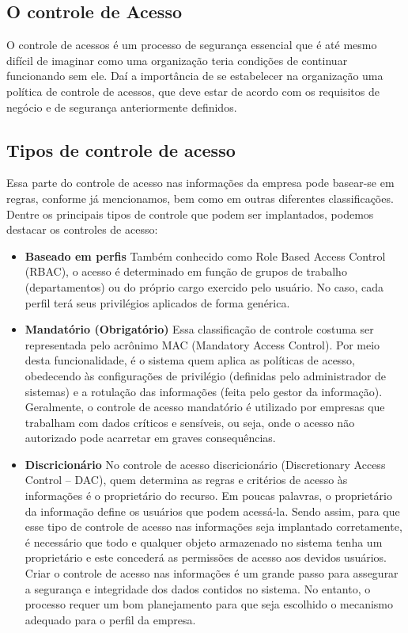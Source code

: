 \documentclass[12pt, a4paper]{report}
\begin{document}
\subsection{O controle de Acesso}
O controle de acessos é um processo de segurança essencial que é até mesmo difícil de imaginar como uma organização teria condições de continuar funcionando sem ele. Daí a importância de se estabelecer na organização uma política de controle de acessos, que deve estar de acordo com os requisitos de negócio e de segurança anteriormente definidos.
\subsection{Tipos de controle de acesso}
Essa parte do controle de acesso nas informações da empresa pode basear-se em regras, conforme já mencionamos, bem como em outras diferentes classificações. Dentre os principais tipos de controle que podem ser implantados, podemos destacar os controles de acesso:
\begin{itemize}
\item \textbf{Baseado em perfis}
Também conhecido como Role Based Access Control (RBAC), o acesso é determinado em função de grupos de trabalho (departamentos) ou do próprio cargo exercido pelo usuário. No caso, cada perfil terá seus privilégios aplicados de forma genérica.
\item \textbf{Mandatório (Obrigatório)}
Essa classificação de controle costuma ser representada pelo acrônimo MAC (Mandatory Access Control). Por meio desta funcionalidade, é o sistema quem aplica as políticas de acesso, obedecendo às configurações de privilégio (definidas pelo administrador de sistemas) e a rotulação das informações (feita pelo gestor da informação).
Geralmente, o controle de acesso mandatório é utilizado por empresas que trabalham com dados críticos e sensíveis, ou seja, onde o acesso não autorizado pode acarretar em graves consequências.
\item  \textbf{Discricionário}
No controle de acesso discricionário (Discretionary Access Control – DAC), quem determina as regras e critérios de acesso às informações é o proprietário do recurso. Em poucas palavras, o proprietário da informação define os usuários que podem acessá-la.
Sendo assim, para que esse tipo de controle de acesso nas informações seja implantado corretamente, é necessário que todo e qualquer objeto armazenado no sistema tenha um proprietário e este concederá as permissões de acesso aos devidos usuários.
Criar o controle de acesso nas informações é um grande passo para assegurar a segurança e integridade dos dados contidos no sistema. No entanto, o processo requer um bom planejamento para que seja escolhido o mecanismo adequado para o perfil da empresa.
\end{itemize}
\end{document}

